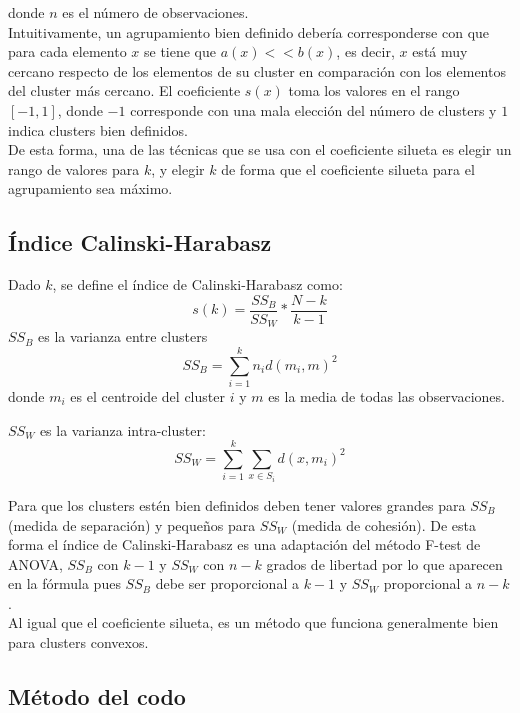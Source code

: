 donde $n$ es el número de observaciones. \\

Intuitivamente, un agrupamiento bien definido debería corresponderse con que para cada elemento $x$ se tiene que $a(x) << b(x)$, es decir, $x$ está muy cercano respecto de los elementos de su cluster en comparación con los elementos del cluster más cercano. El coeficiente $s(x)$ toma los valores en el rango $\left[ -1, 1\right]$, donde $-1$ corresponde con una mala elección del número de clusters y $1$ indica clusters bien definidos. \\

De esta forma, una de las técnicas que se usa con el coeficiente silueta es elegir un rango de valores para $k$, y elegir $k$ de forma que el coeficiente silueta para el agrupamiento sea máximo.

\subsection{Índice Calinski-Harabasz}
Dado $k$, se define el índice de Calinski-Harabasz como:
\begin{equation}
s(k) = \frac{SS_B}{SS_W} * \frac{N-k}{k-1} \nonumber
\end{equation}
$SS_B$ es la varianza entre clusters
\begin{equation}
SS_B = \sum_{i=1}^{k}n_id(m_i, m)^2 \nonumber
\end{equation}
donde $m_i$ es el centroide del cluster $i$ y $m$ es la media de todas las observaciones.

$SS_W$ es la varianza intra-cluster:
\begin{equation}
SS_W = \sum_{i=1}^{k}\sum_{x\in S_i}d(x, m_i)^2 \nonumber
\end{equation}

Para que los clusters estén bien definidos deben tener valores grandes para $SS_B$ (medida de separación) y peque\~nos para $SS_W$ (medida de cohesión). De esta forma el índice de Calinski-Harabasz es una adaptación del método F-test de ANOVA, $SS_B$ con $k-1$ y $SS_W$ con $n-k$ grados de libertad por lo que aparecen en la fórmula pues $SS_B$ debe ser proporcional a $k-1$ y $SS_W$ proporcional a $n-k$.  \\

Al igual que el coeficiente silueta, es un método que funciona generalmente bien para clusters convexos.

\subsection{Método del codo}
